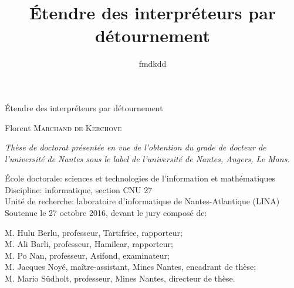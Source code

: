 

\newcommand{\titlefr}{Étendre des interpréteurs par détournement}
\newcommand{\subtitlefr}{Comment j'ai appris à ne plus m'en faire et à aimer le code}
\newcommand{\titleen}{Extending interpreters by diversion}

\title{\titlefr}
\author{fmdkdd}


\AddToShipoutPicture*{\BackgroundPic}


\frontmatter

\begin{titlingpage}
\raggedright
{}
\sffamily

{\noindent\Huge\titlefr}

\vspace{1.5cm}

\LARGE
\noindent
Florent \textsc{Marchand de Kerchove}

\vfill

{\rmfamily\normalsize
\itshape
Thèse de doctorat présentée en vue de l'obtention du
grade de docteur de l'université de Nantes
sous le label de l'université de Nantes, Angers, Le Mans.

\vspace{1em}
École doctorale: sciences et technologies de l'information et mathématiques\\
Discipline: informatique, section CNU 27\\
Unité de recherche: laboratoire d'informatique de Nantes-Atlantique (LINA)\\

\vspace{1em}
Soutenue le 27 octobre 2016, devant le jury composé de:

\vspace{0.5em}
M. Hulu Berlu, professeur, Tartifrice, rapporteur;\\
M. Ali Barli, professeur, Hamilcar, rapporteur;\\
M. Po Nan, professeur, Asifond, examinateur;\\
M. Jacques Noyé, maître-assistant, Mines Nantes, encadrant de thèse;\\
M. Mario Südholt, professeur, Mines Nantes, directeur de thèse.\\
}
\restoregeometry
\end{titlingpage}

